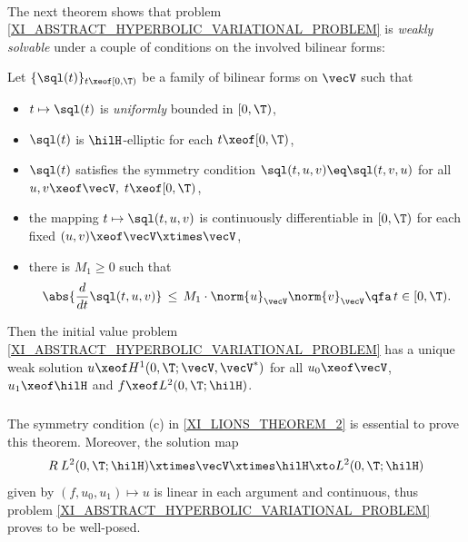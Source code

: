 \documentclass[11pt,twoside]{article}
\begin{document}
\paragraph{}
The next theorem shows that
problem \ref{XI_ABSTRACT_HYPERBOLIC_VARIATIONAL_PROBLEM}
is \textit{weakly solvable} under a couple of conditions
on the involved bilinear forms:

\begin{theorem1}\label{XI_LIONS_THEOREM_2}
Let $\{\sql(t)\}_{t \xeof [0,\T)}$ be a family
of bilinear forms on $\vecV$ such that

\begin{itemize}[leftmargin=20pt]
\item[(a)]
$t \mapsto \sql(t)$ is \textit{uniformly} bounded in $[0,\T)$,

\item[(b)]
$\sql(t)$ is $\hilH$-elliptic for each $t \xeof [0,\T)$,

\item[(c)]
$\sql(t)$ satisfies the symmetry condition
$\sql(t,u,v) \eq \sql(t,v,u)$
for all $u,v \xeof \vecV, \; t \xeof [0,\T)$,

\item[(d)]
the mapping $t \mapsto \sql(t,u,v)$ is continuously differentiable in $[0,\T)$
for each fixed $(u,v) \xeof \vecV \xtimes \vecV$,

\item[(e)]
there is $M_1 \geq 0$ such that
\[
\abs{ \frac{d}{dt} \sql(t,u,v)} \, \leq \, 
M_1 \cdot \norm{u}_{\vecV} \norm{v}_{\vecV}
\qfa \, t \in [0,\T).
\]
\end{itemize}
Then the initial value problem
\eqref{XI_ABSTRACT_HYPERBOLIC_VARIATIONAL_PROBLEM}
has a unique weak solution $u \xeof H^1(0,\T;\vecV,\vecV^*)$
for all $u_0 \xeof \vecV$,
        $u_1 \xeof \hilH$ and
        $f \xeof L^2(0,\T;\hilH)$.
\end{theorem1}

\subparagraph{}
The symmetry condition (c) in \ref{XI_LIONS_THEOREM_2} is essential
to prove this theorem.
Moreover,
the solution map
\[
R\:L^2(0,\T;\hilH) \xtimes \vecV \xtimes \hilH \xto L^2(0,\T;\hilH)
\]
given by $(f,u_0,u_1) \mapsto u$ is linear in each argument and continuous,
thus problem \eqref{XI_ABSTRACT_HYPERBOLIC_VARIATIONAL_PROBLEM} proves
to be well-posed.
\end{document}
